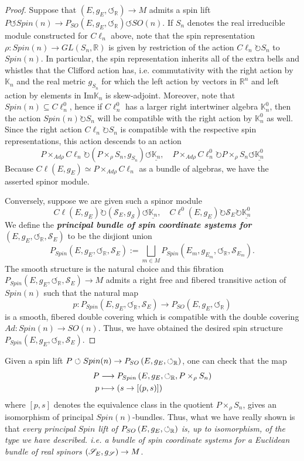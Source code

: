\documentclass[openany, 11pt]{article}
\theoremstyle{definition}
\theoremstyle{remark}
\def\lp{\ensuremath{\left(}}
\def\rp{\ensuremath{\right)}}
\def\Sc{\ensuremath{\mathscr{S}}}
\def\cal{\ensuremath{\boldsymbol{\circlearrowleft}}}
\def\bR{\ensuremath{\mathbb{R}}}
\def\bK{\ensuremath{\mathbb{K}}}
\begin{document}
\begin{proof}
    Suppose that $(E,g_E,\cal_{\bR})\rightarrow M$ admits a spin lift $P\circlearrowleft Spin(n)\rightarrow P_{SO}(E,g_E,\cal_{\bR})\circlearrowleft SO(n)$. If $S_n$ denotes the real irreducible module constructed for $C\ell_n$ above, note that the spin representation $\rho :Spin(n)\rightarrow GL(S_n,\bR)$ is given by restriction of the action $C\ell_n\circlearrowright S_n$ to $Spin(n)$. In particular, the spin representation inherits all of the extra bells and whistles that the Clifford action has, i.e. commutativity with the right action by $\bK_n$ and the real metric $g_{S_n}$ for which the left action by vectors in $\bR^n$ and left action by elements in $\text{Im}\bK_n$ is skew-adjoint. Moreover, note that $Spin(n)\subseteq C\ell^0_n$, hence if $C\ell^0_n$ has a larger right intertwiner algebra $\bK^0_n$, then the action $Spin(n)\circlearrowright S_n$ will be compatible with the right action by $\bK^0_n$ as well. Since the right action $C\ell_n\circlearrowright S_n$ is compatible with the respective spin representations, this action descends to an action
    \[
        P\times_{Ad\rho} C\ell_n\circlearrowright (P\times_{\rho}S_n,g_{S_n})\circlearrowleft \underline{\bK_n},\quad P\times_{Ad\rho}C\ell^0_n\circlearrowright P\times_{\rho}S_n\circlearrowleft \underline{\bK^0_n}
    \]
    Because $C\ell(E,g_E)\simeq P\times_{Ad\rho}C\ell_n$ as a bundle of algebras, we have the asserted spinor module.\par
    Conversely, suppose we are given such a spinor module 
    \[
        C\ell(E,g_E)\circlearrowright (\Sc_E,g_{\Sc})\circlearrowleft\underline{\bK_n},\quad C\ell^0(E,g_E)\circlearrowright \Sc_E\circlearrowright \underline{\bK^0_n}
    \]
    We define the \textbf{\emph{principal bundle of spin coordinate systems for $(E,g_E,\cal_{\bR},\Sc_E)$}} to be the disjiont union
    \[
    P_{Spin}(E,g_E,\cal_{\bR},\Sc_E):=\bigsqcup_{m\in M}P_{Spin}(E_m,g_{E_m},\cal_{\bR},\Sc_{E_m}).
    \]
    The smooth structure is the natural choice and this fibration $P_{Spin}(E,g_E,\cal_{\bR},\Sc_E)\rightarrow M$ admits a right free and fibered transitive action of $Spin(n)$ such that the natural map
    \[
        p:P_{Spin}(E,g_E,\cal_{\bR},\Sc_E)\rightarrow P_{SO}(E,g_E,\cal_{\bR})
    \]
    is a smooth, fibered double covering which is compatible with the double covering $Ad:Spin(n)\rightarrow SO(n)$. Thus, we have obtained the desired spin structure $P_{Spin}(E,g_E,\cal_{\bR},\Sc_E)$.
\end{proof}
Given a spin lift $P\circlearrowleft Spin(n)\rightarrow P_{SO}\lp E,g_E,\cal_{\bR}\rp$, one can check that the map
\begin{align*}
    P&\longrightarrow P_{Spin}\lp E,g_E,\cal_{\bR},P\times_{\rho}S_n\rp\\
    p&\longmapsto \lp s\rightarrow [(p,s)]\rp
\end{align*}
where $[p,s]$ denotes the equivalence class in the quotient $P\times_{\rho}S_n$, gives an isomorphism of principal $Spin(n)$-bundles. Thus, what we have really shown is that \emph{every principal $Spin$ lift of $P_{SO}\lp E,g_E,\cal_{\bR}\rp$ is, up to isomorphism, of the type we have described. i.e. a bundle of spin coordinate systems for a Euclidean bundle of real spinors $\lp\Sc_E,g_{\Sc}\rp\rightarrow M$}.
\end{document}
